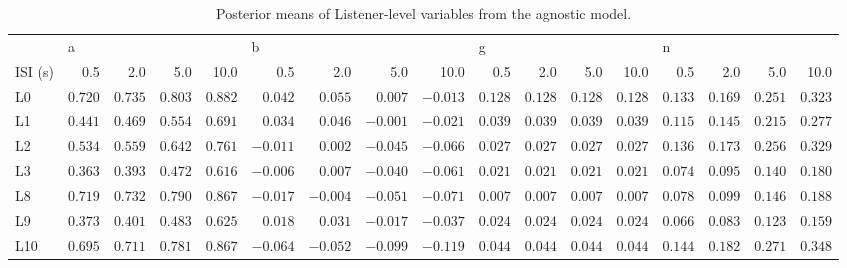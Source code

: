\begin{table} \centering \caption{Posterior means of Listener-level variables from the agnostic model.} \label{vars} \begin{tabular}{lrrrrrrrrrrrrrrrr} \toprule {} & \multicolumn{4}{l}{a} & \multicolumn{4}{l}{b} & \multicolumn{4}{l}{g} & \multicolumn{4}{l}{n} \\ ISI (s) & 0.5 & 2.0 & 5.0 & 10.0 & 0.5 & 2.0 & 5.0 & 10.0 & 0.5 & 2.0 & 5.0 & 10.0 & 0.5 & 2.0 & 5.0 & 10.0 \\ \midrule L0 & $0.720$ & $0.735$ & $0.803$ & $0.882$ & $0.042$ & $0.055$ & $0.007$ & $-0.013$ & $0.128$ & $0.128$ & $0.128$ & $0.128$ & $0.133$ & $0.169$ & $0.251$ & $0.323$ \\ L1 & $0.441$ & $0.469$ & $0.554$ & $0.691$ & $0.034$ & $0.046$ & $-0.001$ & $-0.021$ & $0.039$ & $0.039$ & $0.039$ & $0.039$ & $0.115$ & $0.145$ & $0.215$ & $0.277$ \\ L2 & $0.534$ & $0.559$ & $0.642$ & $0.761$ & $-0.011$ & $0.002$ & $-0.045$ & $-0.066$ & $0.027$ & $0.027$ & $0.027$ & $0.027$ & $0.136$ & $0.173$ & $0.256$ & $0.329$ \\ L3 & $0.363$ & $0.393$ & $0.472$ & $0.616$ & $-0.006$ & $0.007$ & $-0.040$ & $-0.061$ & $0.021$ & $0.021$ & $0.021$ & $0.021$ & $0.074$ & $0.095$ & $0.140$ & $0.180$ \\ L8 & $0.719$ & $0.732$ & $0.790$ & $0.867$ & $-0.017$ & $-0.004$ & $-0.051$ & $-0.071$ & $0.007$ & $0.007$ & $0.007$ & $0.007$ & $0.078$ & $0.099$ & $0.146$ & $0.188$ \\ L9 & $0.373$ & $0.401$ & $0.483$ & $0.625$ & $0.018$ & $0.031$ & $-0.017$ & $-0.037$ & $0.024$ & $0.024$ & $0.024$ & $0.024$ & $0.066$ & $0.083$ & $0.123$ & $0.159$ \\ L10 & $0.695$ & $0.711$ & $0.781$ & $0.867$ & $-0.064$ & $-0.052$ & $-0.099$ & $-0.119$ & $0.044$ & $0.044$ & $0.044$ & $0.044$ & $0.144$ & $0.182$ & $0.271$ & $0.348$ \\ \bottomrule \end{tabular} \end{table}